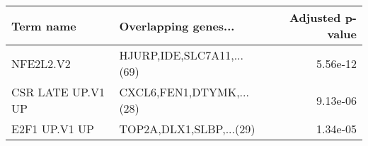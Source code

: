 \begin{tabular}{llr}
\toprule
        Term name &      Overlapping genes... &  Adjusted p-value \\
\midrule
        NFE2L2.V2 & HJURP,IDE,SLC7A11,...(69) &          5.56e-12 \\
CSR LATE UP.V1 UP &  CXCL6,FEN1,DTYMK,...(28) &          9.13e-06 \\
    E2F1 UP.V1 UP &   TOP2A,DLX1,SLBP,...(29) &          1.34e-05 \\
\bottomrule
\end{tabular}
